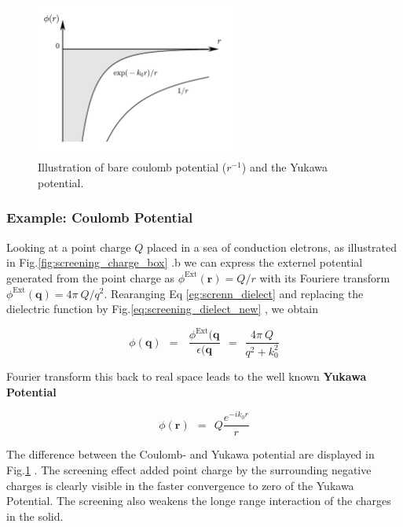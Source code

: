 \documentclass[10pt]{report}
\numberwithin{equation}{chapter}
\newcommand{\myRef}[1]{
  Fig.\ref{#1}
}
\newcommand{\refEq}[1]{
  Eq  \ref{#1}
}
\begin{document}
\begin{figure}
  \centering
  \includegraphics[width=0.6\textwidth]{../img/screening_yukawa.pdf}
  \caption{Illustration of bare coulomb potential ($r^{-1}$) and the Yukawa potential.}
  \label{fig:screening_yukawa}
\end{figure}



\subsubsection{Example: Coulomb Potential}

Looking at a point charge $Q$ placed in a sea of conduction eletrons, as illustrated in \myRef{fig:screening_charge_box}.b we can express the externel potential generated from the point charge as $\phi^\text{Ext}(\mathbf{r}) = Q/r$ with its Fouriere transform  $\phi^\text{Ext}(\mathbf{q}) = 4\pi\ Q/q^2$. Rearanging \refEq{eg:screnn_dielect} and replacing the dielectric function by \myRef{eq:screening_dielect_new}, we obtain

\begin{equation}
  \phi(\mathbf{q}) ~~=~~~\frac{\phi^\text{Ext}(\mathbf{q}}{\epsilon(\mathbf{q}} 
  ~~=~~ \frac{4\pi\ Q}{q^2 + k^2_0}
\end{equation}

Fourier transform this back to real space leads to the well known \textbf{Yukawa Potential} 

\begin{equation}
  \phi(\mathbf{r}) ~~=~~ Q \frac{e^{-i k_0 r}}{r}
\end{equation}

The difference between the Coulomb- and Yukawa potential are displayed in \myRef{fig:screening_yukawa}. The screening effect added point charge by the surrounding negative charges is clearly visible in the faster convergence to zero of the Yukawa Potential. The screening also weakens the longe range interaction of the charges in the solid.
\end{document}
